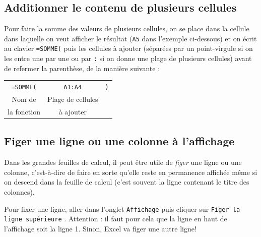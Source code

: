 \subsection{Additionner le contenu de plusieurs cellules}\label{Calc3Somme}

Pour faire la somme des valeurs de plusieurs cellules, on se place dans la cellule dans laquelle on veut afficher le résultat (\texttt{A5} dans l'exemple ci-dessous) et on écrit au clavier \texttt{=SOMME(} puis les cellules à ajouter (séparées par un point-virgule si on les entre une par une ou par \texttt{:} si on donne une plage de plusieurs cellules) avant de refermer la parenthèse, de la manière suivante :

\begin{center}
\begin{tabular}{ccc}
\texttt{=SOMME(} & \texttt{A1:A4} &   \texttt{)} \\  
Nom de & Plage de cellules  & \\
la fonction & à ajouter & \\  
\end{tabular}
\end{center}


\subsection{Figer une ligne ou une colonne à l'affichage}\label{Calc3fixer} 

Dans les grandes feuilles de calcul, il peut être utile de \emph{figer} une ligne ou une colonne, c'est-à-dire de faire en sorte qu'elle reste en permanence affichée même si on descend dans la feuille de calcul (c'est souvent la ligne contenant le titre des colonnes).


Pour fixer une ligne, aller dans l'onglet \texttt{Affichage}  puis cliquer sur \texttt{Figer la ligne supérieure} . Attention : il faut pour cela que la ligne en haut de l'affichage soit la ligne 1. Sinon, Excel va figer une autre ligne!


